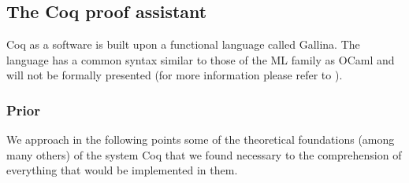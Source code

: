\documentclass{article}
\begin{document}
    

    \subsection{The Coq proof assistant}
    Coq as a software is built upon a functional language called Gallina. The language has a common syntax similar to those of the ML family as OCaml and will not be formally presented (for more information please refer to \cite{Coq}).
        \subsubsection{Prior}
        We approach in the following points some of the theoretical foundations (among many others)  of the system Coq that we found necessary to the comprehension of everything that would be implemented in them.
\end{document}
